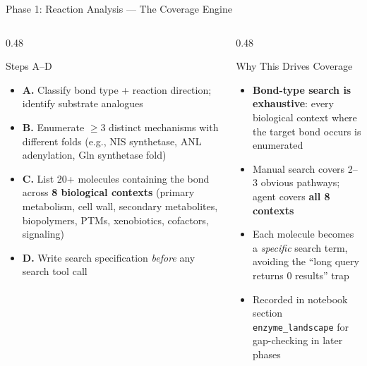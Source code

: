 \documentclass[aspectratio=169, 11pt]{beamer}
\begin{document}
\begin{frame}{Phase 1: Reaction Analysis --- The Coverage Engine}
\vspace{-4pt}
\begin{columns}[T]
\begin{column}{0.48\textwidth}
\begin{block}{\small Steps A--D}
\begin{itemize}\scriptsize
\setlength\itemsep{1pt}
\item \textbf{A.} Classify bond type + reaction direction; identify substrate analogues
\item \textbf{B.} Enumerate $\geq$3 distinct mechanisms with different folds (e.g., NIS synthetase, ANL adenylation, Gln synthetase fold)
\item \textbf{C.} List 20+ molecules containing the bond across \textbf{8 biological contexts} (primary metabolism, cell wall, secondary metabolites, biopolymers, PTMs, xenobiotics, cofactors, signaling)
\item \textbf{D.} Write search specification \textit{before} any search tool call
\end{itemize}
\end{block}
\end{column}
\begin{column}{0.48\textwidth}
\begin{exampleblock}{\small Why This Drives Coverage}
\begin{itemize}\scriptsize
\setlength\itemsep{1pt}
\item \textbf{Bond-type search is exhaustive}: every biological context where the target bond occurs is enumerated
\item Manual search covers 2--3 obvious pathways; agent covers \textbf{all 8 contexts}
\item Each molecule becomes a \textit{specific} search term, avoiding the ``long query returns 0 results'' trap
\item Recorded in notebook section \texttt{enzyme\_landscape} for gap-checking in later phases
\end{itemize}
\end{exampleblock}
\end{column}
\end{columns}
\end{frame}
\end{document}
